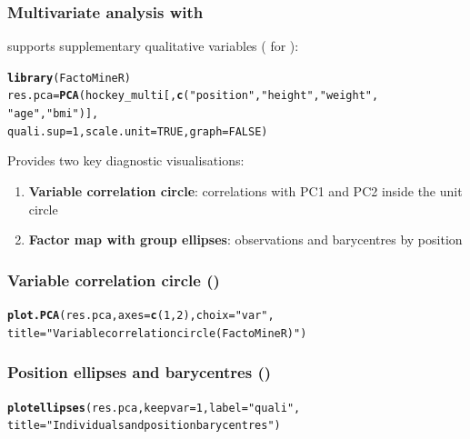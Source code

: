 \documentclass[aspectratio=169]{beamer}\usepackage[]{graphicx}\usepackage[]{xcolor}
\makeatletter
\newcommand{\hlnum}[1]{\textcolor[rgb]{0.686,0.059,0.569}{#1}}%
\newcommand{\hlsng}[1]{\textcolor[rgb]{0.192,0.494,0.8}{#1}}%
\newcommand{\hldef}[1]{\textcolor[rgb]{0.345,0.345,0.345}{#1}}%
\newcommand{\hlkwb}[1]{\textcolor[rgb]{0.69,0.353,0.396}{#1}}%
\newcommand{\hlkwc}[1]{\textcolor[rgb]{0.333,0.667,0.333}{#1}}%
\newcommand{\hlkwd}[1]{\textcolor[rgb]{0.737,0.353,0.396}{\textbf{#1}}}%
\newenvironment{kframe}{%
 \def\at@end@of@kframe{}%
 \ifinner\ifhmode%
  \def\at@end@of@kframe{\end{minipage}}%
  \begin{minipage}{\columnwidth}%
 \fi\fi%
 \def\FrameCommand##1{\hskip\@totalleftmargin \hskip-\fboxsep
 \colorbox{shadecolor}{##1}\hskip-\fboxsep
     \hskip-\linewidth \hskip-\@totalleftmargin \hskip\columnwidth}%
 \MakeFramed {\advance\hsize-\width
   \@totalleftmargin\z@ \linewidth\hsize
   \@setminipage}}%
 {\par\unskip\endMakeFramed%
 \at@end@of@kframe}
\newenvironment{knitrout}{}{} %
\makeatother
\begin{document}
\begin{frame}[fragile]\frametitle{Multivariate analysis with }
 supports supplementary qualitative variables ( for ):
\vfill
\begin{knitrout}
\color{fgcolor}\begin{kframe}
\begin{alltt}
\hlkwd{library}\hldef{(FactoMineR)}
\hldef{res.pca} \hlkwb{=} \hlkwd{PCA}\hldef{(hockey_multi[,} \hlkwd{c}\hldef{(}\hlsng{"position"}\hldef{,} \hlsng{"height"}\hldef{,} \hlsng{"weight"}\hldef{,}
                               \hlsng{"age"}\hldef{,} \hlsng{"bmi"}\hldef{)],}
              \hlkwc{quali.sup} \hldef{=} \hlnum{1}\hldef{,} \hlkwc{scale.unit} \hldef{=} \hlnum{TRUE}\hldef{,} \hlkwc{graph} \hldef{=} \hlnum{FALSE}\hldef{)}
\end{alltt}
\end{kframe}
\end{knitrout}
\vfill
Provides two key diagnostic visualisations:
\begin{enumerate}
\item \textbf{Variable correlation circle}: correlations with PC1 and PC2 inside the unit circle
\item \textbf{Factor map with group ellipses}: observations and barycentres by position
\end{enumerate}
\end{frame}


\begin{frame}[fragile]\frametitle{Variable correlation circle ()}
\begin{knitrout}
\color{fgcolor}\begin{kframe}
\begin{alltt}
\hlkwd{plot.PCA}\hldef{(res.pca,} \hlkwc{axes} \hldef{=} \hlkwd{c}\hldef{(}\hlnum{1}\hldef{,} \hlnum{2}\hldef{),} \hlkwc{choix} \hldef{=} \hlsng{"var"}\hldef{,}
         \hlkwc{title} \hldef{=} \hlsng{"Variable correlation circle (FactoMineR)"}\hldef{)}
\end{alltt}
\end{kframe}
\end{knitrout}
\end{frame}



\begin{frame}[fragile]\frametitle{Position ellipses and barycentres ()}
\begin{knitrout}
\color{fgcolor}\begin{kframe}
\begin{alltt}
\hlkwd{plotellipses}\hldef{(res.pca,} \hlkwc{keepvar} \hldef{=} \hlnum{1}\hldef{,} \hlkwc{label} \hldef{=} \hlsng{"quali"}\hldef{,}
             \hlkwc{title} \hldef{=} \hlsng{"Individuals and position barycentres"}\hldef{)}
\end{alltt}
\end{kframe}
\end{knitrout}
\end{frame}






\end{document}
